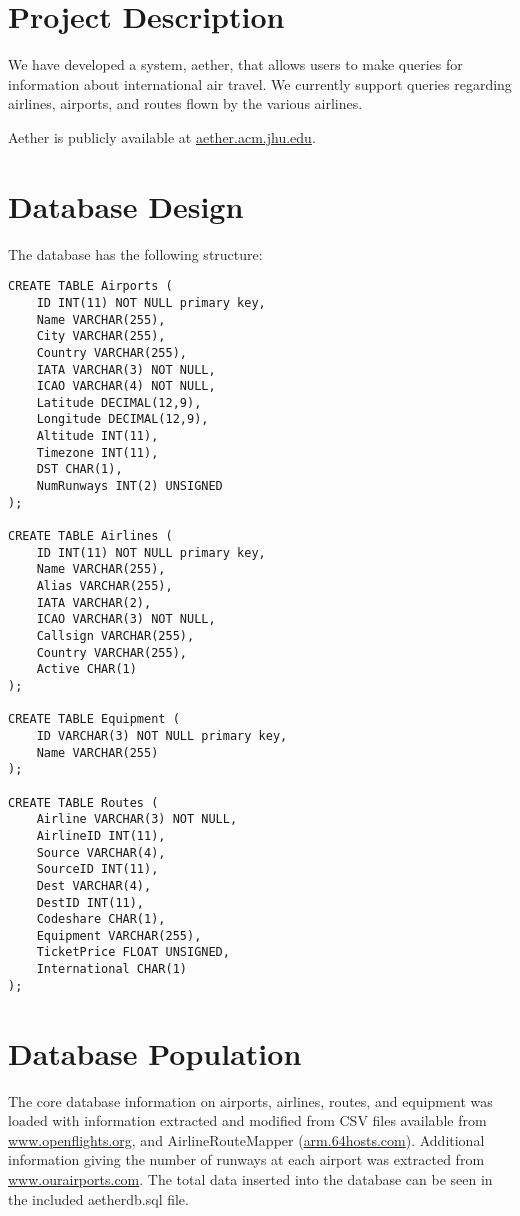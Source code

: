 %
%
%
%
%
%
%

\maketitle

\tableofcontents

\section{Project Description}
	We have developed a system, aether, that allows users to make queries for information about international air travel. We currently support queries regarding airlines, airports, and routes flown by the various airlines.
		
\indent Aether is publicly available at \url{aether.acm.jhu.edu}.

\section{Database Design}
	The database has the following structure:
    
\begin{verbatim}
CREATE TABLE Airports (
    ID INT(11) NOT NULL primary key,
    Name VARCHAR(255),
    City VARCHAR(255),
    Country VARCHAR(255),
    IATA VARCHAR(3) NOT NULL,
    ICAO VARCHAR(4) NOT NULL,
    Latitude DECIMAL(12,9),
    Longitude DECIMAL(12,9),
    Altitude INT(11),
    Timezone INT(11),
    DST CHAR(1),
    NumRunways INT(2) UNSIGNED
);
    
CREATE TABLE Airlines (
    ID INT(11) NOT NULL primary key,
    Name VARCHAR(255),
    Alias VARCHAR(255),
    IATA VARCHAR(2),
    ICAO VARCHAR(3) NOT NULL,
    Callsign VARCHAR(255),
    Country VARCHAR(255),
    Active CHAR(1)
);

CREATE TABLE Equipment ( 
    ID VARCHAR(3) NOT NULL primary key,
    Name VARCHAR(255)
);
    
CREATE TABLE Routes (
    Airline VARCHAR(3) NOT NULL,
    AirlineID INT(11),
    Source VARCHAR(4),
    SourceID INT(11),
    Dest VARCHAR(4),
    DestID INT(11),
    Codeshare CHAR(1),
    Equipment VARCHAR(255),
    TicketPrice FLOAT UNSIGNED,
    International CHAR(1)
);
\end{verbatim}

\section{Database Population}
	The core database information on airports, airlines, routes, and equipment was loaded with information extracted and modified from CSV files available from \url{www.openflights.org}, and AirlineRouteMapper (\url{arm.64hosts.com}). Additional information giving the number of runways at each airport was extracted from \mbox{\url{www.ourairports.com}}. The total data inserted into the database can be seen in the included aetherdb.sql file.

